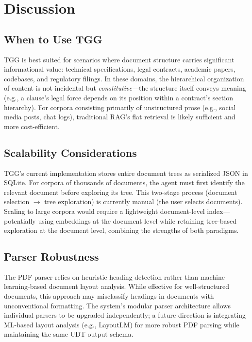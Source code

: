 \documentclass[conference]{IEEEtran}
\begin{document}
\section{Discussion}

\subsection{When to Use TGG}

TGG is best suited for scenarios where document structure carries significant informational value: technical specifications, legal contracts, academic papers, codebases, and regulatory filings. In these domains, the hierarchical organization of content is not incidental but \textit{constitutive}---the structure itself conveys meaning (e.g., a clause's legal force depends on its position within a contract's section hierarchy). For corpora consisting primarily of unstructured prose (e.g., social media posts, chat logs), traditional RAG's flat retrieval is likely sufficient and more cost-efficient.

\subsection{Scalability Considerations}

TGG's current implementation stores entire document trees as serialized JSON in SQLite. For corpora of thousands of documents, the agent must first identify the relevant document before exploring its tree. This two-stage process (document selection $\rightarrow$ tree exploration) is currently manual (the user selects documents). Scaling to large corpora would require a lightweight document-level index---potentially using embeddings at the document level while retaining tree-based exploration at the document level, combining the strengths of both paradigms.

\subsection{Parser Robustness}

The PDF parser relies on heuristic heading detection rather than machine learning-based document layout analysis. While effective for well-structured documents, this approach may misclassify headings in documents with unconventional formatting. The system's modular parser architecture allows individual parsers to be upgraded independently; a future direction is integrating ML-based layout analysis (e.g., LayoutLM) for more robust PDF parsing while maintaining the same UDT output schema.
\end{document}
